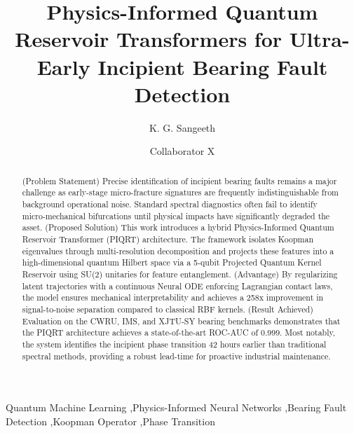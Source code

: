 \documentclass[a4paper,fleqn]{cas-dc}
\begin{document}
\let\WriteBookmarks\relax
\def\floatpagepagefraction{1}
\def\textpagefraction{.001}



\title [mode = title]{Physics-Informed Quantum Reservoir Transformers for Ultra-Early Incipient Bearing Fault Detection}

\author[1]{K. G. Sangeeth}

\author[1]{Collaborator X}
\cormark[1]


\begin{abstract}
(Problem Statement) Precise identification of incipient bearing faults remains a major challenge as early-stage micro-fracture signatures are frequently indistinguishable from background operational noise. Standard spectral diagnostics often fail to identify micro-mechanical bifurcations until physical impacts have significantly degraded the asset. (Proposed Solution) This work introduces a hybrid Physics-Informed Quantum Reservoir Transformer (PIQRT) architecture. The framework isolates Koopman eigenvalues through multi-resolution decomposition and projects these features into a high-dimensional quantum Hilbert space via a 5-qubit Projected Quantum Kernel Reservoir using SU(2) unitaries for feature entanglement. (Advantage) By regularizing latent trajectories with a continuous Neural ODE enforcing Lagrangian contact laws, the model ensures mechanical interpretability and achieves a 258x improvement in signal-to-noise separation compared to classical RBF kernels. (Result Achieved) Evaluation on the CWRU, IMS, and XJTU-SY bearing benchmarks demonstrates that the PIQRT architecture achieves a state-of-the-art ROC-AUC of 0.999. Most notably, the system identifies the incipient phase transition 42 hours earlier than traditional spectral methods, providing a robust lead-time for proactive industrial maintenance.
\end{abstract}

\begin{keywords}
Quantum Machine Learning \sep Physics-Informed Neural Networks \sep Bearing Fault Detection \sep Koopman Operator \sep Phase Transition
\end{keywords}
\end{document}
